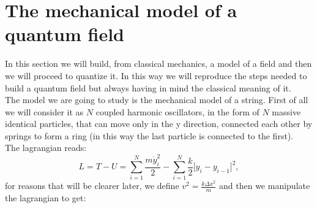\section{The mechanical model of a quantum field}
In this section we will build, from classical mechanics, a model of a field and then we will proceed to quantize it. In this way we will reproduce the steps needed to build a quantum field but always having in mind the classical meaning of it.\\
The model we are going to study is the mechanical model of a string. First of all we will consider it as $N$ coupled harmonic oscillators, in the form of $N$ massive identical particles, that can move only in the y direction, connected each other by springs to form a ring (in this way the last particle is connected to the first).\\
The lagrangian reads:
\begin{equation*}
    L=T-U=\sum_{i=1}^{N}\frac{m\dot y_i^2}{2}-\sum_{i=1}^{N}\frac{k}{2}\big[y_i-y_{i-1}\big]^2,
\end{equation*}
for reasons that will be clearer later, we define $v^2=\frac{k\Delta x^2}{m}$ and then we manipulate the lagrangian to get:
